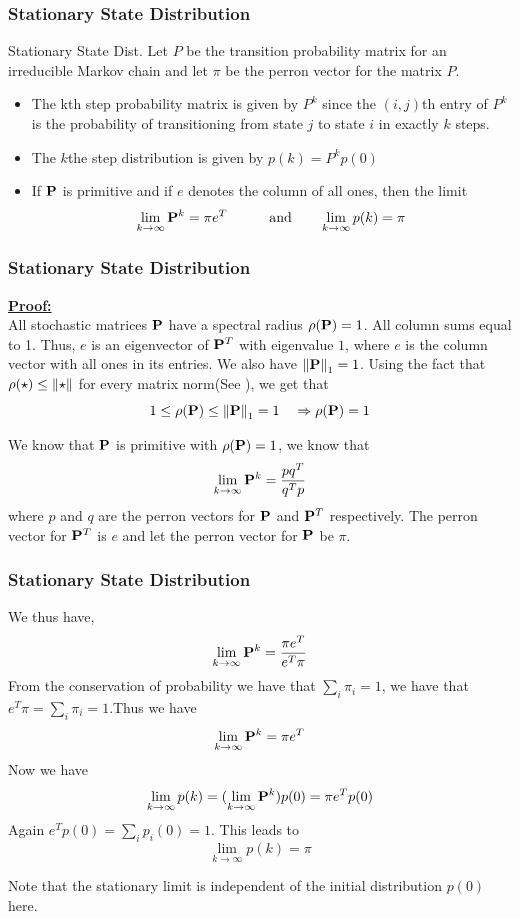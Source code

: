 \documentclass[9pt]{beamer}
\newcommand{\PP}{\bold{P}}
\begin{document}
\begin{frame}
  \frametitle{Stationary State Distribution}
  \begin{block}{Stationary State Dist.}
  Let $P$ be the transition probability matrix for an irreducible Markov chain and 
  let $\pi$ be the perron vector for the matrix $P$. 
  \begin{itemize}
    \item The kth step probability matrix is given by
       $P^k$ since the $(i,j)$th entry of $P^k$ is the probability of transitioning from state $j$ to state $i$ in exactly $k$ steps.
    \item The $k$the step distribution is given by
      $p(k) = P^k p(0)$
      \item If $\PP$ is primitive and if $e$ denotes the column of all ones, then the limit
        $$\lim_{k \to \infty} \PP^k = \pi e^T \quad \quad \quad \text{and} \quad \quad
           \lim_{k \to \infty} p(k) = \pi$$ 

  \end{itemize}
  \end{block}


\end{frame}
\begin{frame}
  \frametitle{Stationary State Distribution}
  \underline{\textbf{Proof: }} \\ 
  All stochastic matrices $\PP$ have a spectral radius $\rho(\PP) =1$. All column sums equal to 
  1. Thus, $e$ is an eigenvector of $\PP^T$ with eigenvalue $1$, where $e$ is the column vector with 
  all ones in its entries. We also have $\norm{\PP}_{1} = 1$. Using the fact that $\rho(\star) \leq \norm{\star}$ for every matrix norm(See \cite{Meyer2000}),
  we get  that 
  $$ 1 \leq \rho(\PP) \leq \norm{\PP}_{1} = 1 ~~~ \Rightarrow \rho (\PP) =1$$

  We know that $\PP$ is primitive with $\rho(\PP) = 1$, we know that 
  $$ \lim_{k \to \infty} \PP^k = \frac{p q^T}{q^T p}  $$
  where $p$ and $q$ are the perron vectors for $\PP$ and $\PP^T$ respectively.
  The perron vector for $\PP^T$ is $e$ and let the perron vector for $\PP$ be $\pi$. 
  

\end{frame}
\begin{frame}
  \frametitle{Stationary State Distribution}

  We thus have,
  $$ \lim_{k \to \infty} \PP^k = \frac{\pi e^T}{e^T \pi}  $$
  From the conservation of probability we have that $\sum_i \pi_i =1$, we have that 
  $e^T\pi = \sum_i \pi_i = 1$.Thus we have 
  $$\lim_{k \to \infty} \PP^k = \pi e^T$$
  Now we have
  $$ \lim_{k \to \infty} p(k) = (\lim_{k \to \infty} \PP^k) p(0)= \pi e^Tp(0)$$
  Again $e^Tp(0) = \sum_i p_i(0) = 1$. This leads to 
  $$  \lim_{k \to \infty} p(k) = \pi $$

  Note that the stationary limit is independent of the initial distribution $p(0)$ here.

\end{frame}
\end{document}
